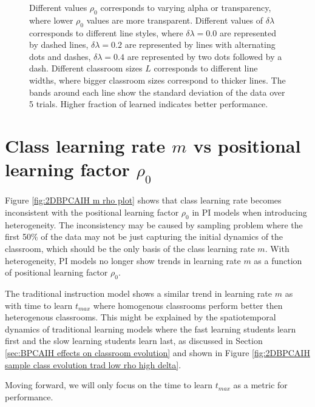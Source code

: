 \begin{figure}[htbp!]
{   Different values $\rho_0$ corresponds to varying alpha or transparency, where lower $\rho_0$ values are more transparent.
   Different values of $\delta\lambda$ corresponds to different line styles, where $\delta\lambda=0.0$ are represented by dashed lines, $\delta\lambda=0.2$ are represented by lines with alternating dots and dashes, $\delta\lambda=0.4$ are represented by two dots followed by a dash.
   Different classroom sizes $L$ corresponds to different line widths, where bigger classroom sizes correspond to thicker lines.
   The bands around each line show the standard deviation of the data over 5 trials.
   Higher fraction of learned indicates better performance.
   }
   \label{fig:2DBPCAIH t-learned comparisons}
\end{figure}

\newpage %

\section{Class learning rate $m$ vs positional learning factor $\rho_0$}\label{sec:BPCAIH m vs rho}

Figure \ref{fig:2DBPCAIH m rho plot} shows that class learning rate becomes inconsistent with the positional learning factor $\rho_0$ in PI models when introducing heterogeneity. 
The inconsistency may be caused by sampling problem where the first 50\% of the data may not be just capturing the initial dynamics of the classroom, which should be the only basis of the class learning rate $m$.
With heterogeneity, PI models no longer show trends in learning rate $m$ as a function of positional learning factor $\rho_0$.

The traditional instruction model shows a similar trend in learning rate $m$ as with time to learn $t_{max}$ where homogenous classrooms perform better then heterogenous classrooms.
This might be explained by the spatiotemporal dynamics of traditional learning models where the fast learning students learn first and the slow learning students learn last, as discussed in Section \ref{sec:BPCAIH effects on classroom evolution} and shown in Figure \ref{fig:2DBPCAIH sample class evolution trad low rho high delta}.

Moving forward, we will only focus on the time to learn $t_{max}$ as a metric for performance.


